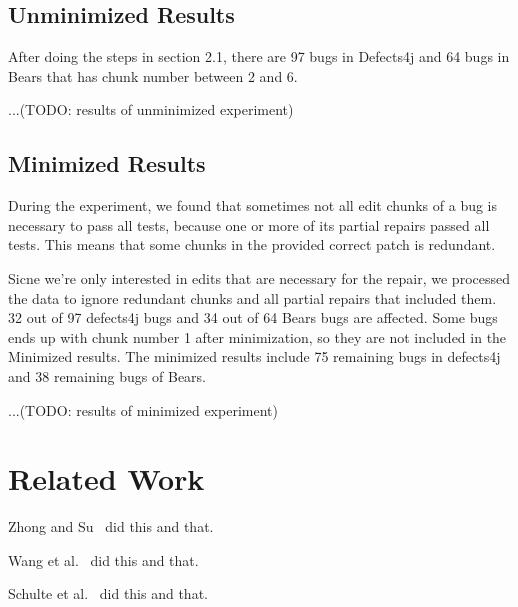 \documentclass[sigconf, timestamp-false, anonymous=true]{acmart}
\begin{document}
\subsection{Unminimized Results}

After doing the steps in section 2.1, there are 97 bugs in Defects4j and 64 bugs in Bears that has chunk number between 2 and 6. 

...(TODO: results of unminimized experiment)

\subsection{Minimized Results}

During the experiment, we found that sometimes not all edit chunks of a bug is necessary to pass all tests, because one or more of its partial repairs passed all tests. This means that some chunks in the provided correct patch is redundant. 

Sicne we're only interested in edits that are necessary for the repair, we processed the data to ignore redundant chunks and all partial repairs that included them. 32 out of 97 defects4j bugs and 34 out of 64 Bears bugs are affected. Some bugs ends up with chunk number 1 after minimization, so they are not included in the Minimized results. The minimized results include 75 remaining bugs in defects4j and 38 remaining bugs of Bears.

...(TODO: results of minimized experiment)

\section{Related Work}
Zhong and Su~\cite{zhong2015} did this and that.

Wang et al.~\cite{wang2018} did this and that.

Schulte et al.~\cite{schulte} did this and that.




\end{document}
